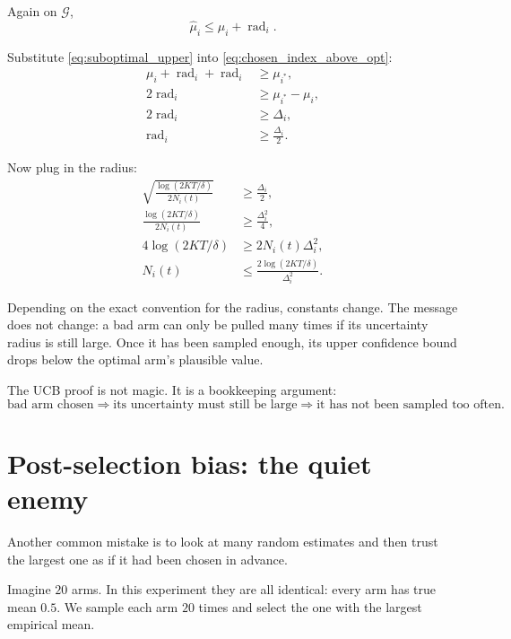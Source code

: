 \documentclass[en,nofont,11pt]{elegantbook}
\begin{document}
Again on $\mathcal{G}$,
\begin{equation}
\widehat\mu_i \leq \mu_i + \operatorname{rad}_i. \label{eq:suboptimal_upper}
\end{equation}

Substitute \eqref{eq:suboptimal_upper} into \eqref{eq:chosen_index_above_opt}:
\begin{align}
\mu_i + \operatorname{rad}_i + \operatorname{rad}_i
&\geq \mu_{i^*},\\
2\operatorname{rad}_i
&\geq \mu_{i^*}-\mu_i,\\
2\operatorname{rad}_i
&\geq \Delta_i,\\
\operatorname{rad}_i
&\geq \frac{\Delta_i}{2}. \label{eq:radius_large}
\end{align}

Now plug in the radius:
\begin{align}
\sqrt{\frac{\log(2KT/\delta)}{2N_i(t)}}
&\geq \frac{\Delta_i}{2},\\
\frac{\log(2KT/\delta)}{2N_i(t)}
&\geq \frac{\Delta_i^2}{4},\\
4\log(2KT/\delta)
&\geq 2N_i(t)\Delta_i^2,\\
N_i(t)
&\leq \frac{2\log(2KT/\delta)}{\Delta_i^2}. \label{eq:ucb_pull_count_simple}
\end{align}

Depending on the exact convention for the radius, constants change.  The message does not change: a bad arm can only be pulled many times if its uncertainty radius is still large.  Once it has been sampled enough, its upper confidence bound drops below the optimal arm's plausible value.

\begin{keyidea}
The UCB proof is not magic.  It is a bookkeeping argument:
\[
\text{bad arm chosen}
\Rightarrow
\text{its uncertainty must still be large}
\Rightarrow
\text{it has not been sampled too often}.
\]
\end{keyidea}

\chapter{Post-selection bias: the quiet enemy}

Another common mistake is to look at many random estimates and then trust the largest one as if it had been chosen in advance.

Imagine $20$ arms.  In this experiment they are all identical: every arm has true mean $0.5$.  We sample each arm $20$ times and select the one with the largest empirical mean.
\end{document}
